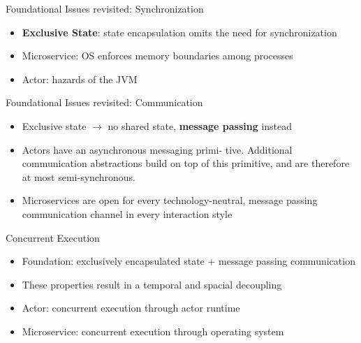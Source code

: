 \documentclass{beamer}
\newcommand{\pdfnote}[1]{\marginnote{\pdfcomment[icon=note]{#1}}}
\begin{document}

\begin{frame}{Foundational Issues revisited: Synchronization}

\begin{itemize}
  \item \textbf{Exclusive State}: state encapsulation omits the need for synchronization
  \item Microservice: OS enforces memory boundaries among processes
  \item Actor: hazards of the JVM
\end{itemize}

\end{frame}


\begin{frame}{Foundational Issues revisited: Communication}

\begin{itemize}
  \item Exclusive state $\rightarrow$ no shared state, \textbf{message passing} instead 
  \item Actors have an asynchronous messaging primi- tive. Additional communication abstractions build on top of this primitive, and are therefore at most semi-synchronous.
  \item Microservices are open for every technology-neutral, message passing communication channel in every interaction style
\end{itemize}

\end{frame}


\begin{frame}{Concurrent Execution}

\pdfnote{remember to say hello}

\begin{itemize}
  \item Foundation: exclusively encapsulated state $+$ message passing communication
  \item These properties result in a temporal and spacial decoupling
  \item Actor: concurrent execution through actor runtime
  \item Microservice: concurrent execution through operating system
\end{itemize}

\end{frame}

\end{document}

